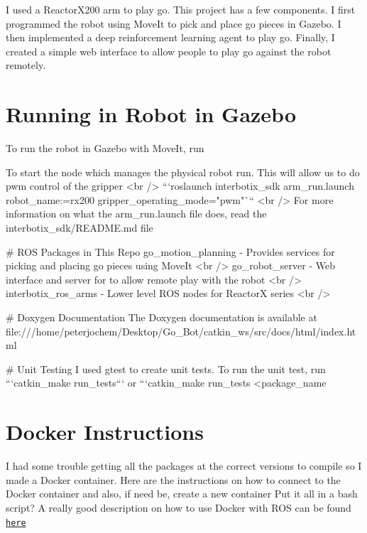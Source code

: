 I used a Reactor\+X200 arm to play go. This project has a few components. I first programmed the robot using Move\+It to pick and place go pieces in Gazebo. I then implemented a deep reinforcement learning agent to play go. Finally, I created a simple web interface to allow people to play go against the robot remotely.

\section*{Running in Robot in Gazebo}

To run the robot in Gazebo with Move\+It, run ~\newline
 
\begin{DoxyCode}
To start the node which manages the physical robot run. This will allow us to do pwm control of the gripper
       <br />
```roslaunch interbotix\_sdk arm\_run.launch robot\_name:=rx200 gripper\_operating\_mode="pwm"``` <br />
For more information on what the arm\_run.launch file does, read the interbotix\_sdk/README.md file

# ROS Packages in This Repo
go\_motion\_planning - Provides services for picking and placing go pieces using MoveIt <br />
go\_robot\_server - Web interface and server for to allow remote play with the robot <br />
interbotix\_ros\_arms - Lower level ROS nodes for ReactorX series <br />

# Doxygen Documentation
The Doxygen documentation is available at
       file:///home/peterjochem/Desktop/Go\_Bot/catkin\_ws/src/docs/html/index.html

# Unit Testing
I used gtest to create unit tests. To run the unit test, run ```catkin\_make run\_tests``` or ```catkin\_make
       run\_tests <package\_name
\end{DoxyCode}


\section*{Docker Instructions}

I had some trouble getting all the packages at the correct versions to compile so I made a Docker container. Here are the instructions on how to connect to the Docker container and also, if need be, create a new container Put it all in a bash script? A really good description on how to use Docker with R\+OS can be found \href{https://docs.freedomrobotics.ai/docs/ros-development-in-docker-on-mac-and-windows}{\tt here} ~\newline


